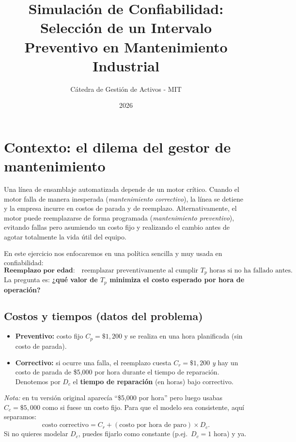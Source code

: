 \documentclass[11pt,a4paper]{article}
\title{Simulación de Confiabilidad: Selección de un Intervalo Preventivo en Mantenimiento Industrial}
\author{Cátedra de Gestión de Activos - MIT}
\date{2026}
\begin{document}
\maketitle

\section{Contexto: el dilema del gestor de mantenimiento}
Una línea de ensamblaje automatizada depende de un motor crítico. Cuando el motor falla de manera inesperada
(\textit{mantenimiento correctivo}), la línea se detiene y la empresa incurre en costos de parada y de reemplazo.
Alternativamente, el motor puede reemplazarse de forma programada (\textit{mantenimiento preventivo}), evitando fallas pero
asumiendo un costo fijo y realizando el cambio antes de agotar totalmente la vida útil del equipo.

En este ejercicio nos enfocaremos en una política sencilla y muy usada en confiabilidad:
\[
\textbf{Reemplazo por edad:}\quad \text{reemplazar preventivamente al cumplir } T_p \text{ horas si no ha fallado antes.}
\]
La pregunta es: \textbf{¿qué valor de $T_p$ minimiza el costo esperado por hora de operación?}

\subsection*{Costos y tiempos (datos del problema)}
\begin{itemize}
    \item \textbf{Preventivo:} costo fijo $C_p = \$1{,}200$ y se realiza en una hora planificada (sin costo de parada).
    \item \textbf{Correctivo:} si ocurre una falla, el reemplazo cuesta $C_r = \$1{,}200$ \emph{y} hay un costo de parada de
    \$5{,}000 por hora durante el tiempo de reparación. Denotemos por $D_c$ el \textbf{tiempo de reparación} (en horas) bajo correctivo.
\end{itemize}

\noindent\textit{Nota:} en tu versión original aparecía ``\$5,000 por hora'' pero luego usabas $C_c=\$5,000$ como si fuese un costo fijo.
Para que el modelo sea consistente, aquí separamos:
\[
\text{costo correctivo} = C_r + (\text{costo por hora de paro})\times D_c.
\]
Si no quieres modelar $D_c$, puedes fijarlo como constante (p.ej.\ $D_c=1$ hora) y ya.
\end{document}
